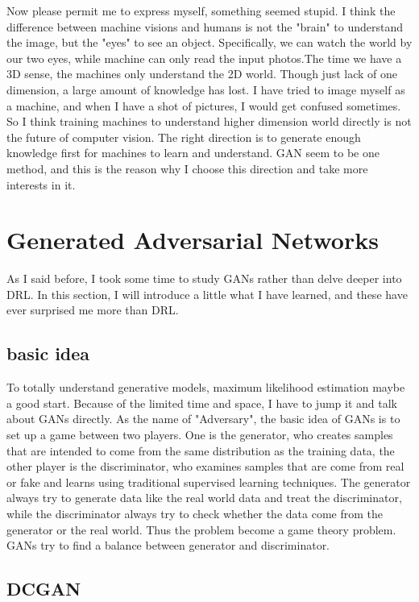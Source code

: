 \documentclass[10pt,twocolumn,letterpaper]{article}
\begin{document}
Now please permit me to express myself, something seemed stupid. I think the difference between machine visions 
and humans is not the "brain" to understand the image, but the "eyes" to see an object. Specifically, we can watch the 
world by our two eyes, while machine can only read the input photos.The time we have a 3D sense, the machines only
understand the 2D world. Though just lack of one dimension, a large amount of knowledge has lost. I have tried to image
myself as a machine, and when I have a shot of pictures, I would get confused sometimes. So I think training machines 
to understand higher dimension world directly is not the future of computer vision. The right direction is to generate enough
knowledge first for machines to learn and understand. GAN seem to be one method, and this is the reason why I choose
this direction and take more interests in it.   

\section{Generated Adversarial Networks}

As I said before, I took some time to study GANs rather than delve deeper into DRL. In this section, I will introduce a little
what I have learned, and these have ever surprised me more than DRL.

\subsection{basic idea}

To totally understand generative models, maximum likelihood estimation maybe a good start. Because of the limited time 
and space, I have to jump it and talk about GANs directly. As the name of "Adversary", the basic idea of GANs is to set up
a game between two players. One is the generator, who creates samples that are intended to come from the same 
distribution as the training data, the other player is the discriminator, who examines samples that are come from real or fake and learns using traditional supervised learning techniques. The generator always try to generate data like the real world data and treat the discriminator, while the discriminator always try to check whether the data come from the generator or the real world. Thus the problem become a game theory problem. 
GANs try to find a balance between generator and discriminator.

\subsection{DCGAN}
\end{document}
